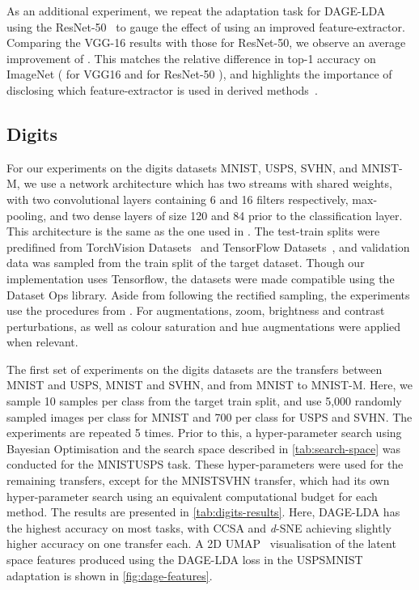 \documentclass[journal]{IEEEtran}
\begin{document}
As an additional experiment, we repeat the adaptation task for DAGE-LDA using the ResNet-50~\cite{he2016deep} to gauge the effect of using an improved feature-extractor. Comparing the VGG-16 results with those for ResNet-50, we observe an average improvement of . This matches the relative difference in top-1 accuracy on ImageNet ( for VGG16 and  for ResNet-50 \cite{he2016deep}), and highlights the importance of disclosing which feature-extractor is used in derived methods~\cite{musgrave2020metric}.


\subsection{Digits}
For our experiments on the digits datasets MNIST, USPS, SVHN, and MNIST-M, we use a network architecture which has two streams with shared weights, with two convolutional layers containing 6 and 16  filters respectively, max-pooling, and two dense layers of size 120 and 84 prior to the classification layer. This architecture is the same as the one used in \cite{motiian2017ccsa}. 
The test-train splits were predifined from TorchVision Datasets~\cite{marcel2010torchvision} and TensorFlow Datasets~\cite{tfds}, and validation data was sampled from the train split of the target dataset. 
Though our implementation uses Tensorflow, the datasets were made compatible using the Dataset Ops library.
Aside from following the rectified sampling, the experiments use the procedures from \cite{fernando2014joint, motiian2017ccsa, xu2019dsne}.
For augmentations, zoom, brightness and contrast perturbations, as well as colour saturation and hue augmentations were applied when relevant. 

The first set of experiments on the digits datasets are the transfers between MNIST and USPS, MNIST and SVHN, and from MNIST to MNIST-M.
Here, we sample 10 samples per class from the target train split, and use 5,000 randomly sampled images per class for MNIST and 700 per class for USPS and SVHN.
The experiments are repeated 5 times.
Prior to this, a hyper-parameter search using Bayesian Optimisation and the search space described in \cref{tab:search-space} was conducted for the MNISTUSPS task. 
These hyper-parameters were used for the remaining transfers, except for the MNISTSVHN transfer, which had its own hyper-parameter search using an equivalent computational budget for each method.
The results are presented in \cref{tab:digits-results}.
Here, DAGE-LDA has the highest accuracy on most tasks, with CCSA and \textit{d}-SNE achieving slightly higher accuracy on one transfer each. 
A 2D UMAP~\cite{mcinnes2018umap} visualisation of the latent space features produced using the DAGE-LDA loss in the USPSMNIST adaptation is shown in \cref{fig:dage-features}.
\end{document}
